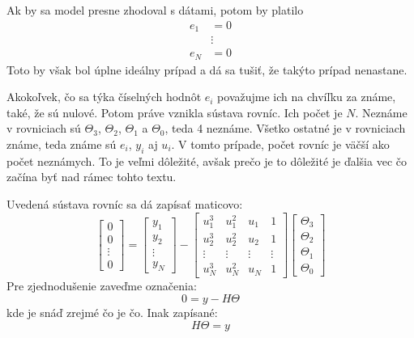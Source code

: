 \documentclass[a4paper, 10pt, ]{article}
\begin{document}
Ak by sa model presne zhodoval s dátami, potom by platilo
\begin{subequations}
    \begin{align}
        e_1 &= 0 \\
        &\vdots \\
        e_N &= 0
    \end{align}
\end{subequations}
Toto by však bol úplne ideálny prípad a dá sa tušiť, že takýto prípad nenastane.

Akokoľvek, čo sa týka číselných hodnôt $e_i$ považujme ich na chvíľku za známe, také, že sú nulové. Potom práve vznikla sústava rovníc. Ich počet je $N$. Neznáme v rovniciach sú $\Theta_3$, $\Theta_2$, $\Theta_1$ a $\Theta_0$, teda 4 neznáme. Všetko ostatné je v rovniciach známe, teda známe sú $e_i$, $y_i$ aj $u_i$. V tomto prípade, počet rovníc je väčší ako počet neznámych. To je veľmi dôležité, avšak prečo je to dôležité je ďalšia vec čo začína byť nad rámec tohto textu.

Uvedená sústava rovníc sa dá zapísať maticovo:
\begin{equation} \label{detailPreurcVseob}
    \begin{bmatrix}
        0 \\ 0 \\\vdots \\ 0
    \end{bmatrix}
    =
    \begin{bmatrix}
        y_1 \\ y_2 \\\vdots \\ y_N
    \end{bmatrix}
    -
    \begin{bmatrix}
        u_1^3 & u_1^2 & u_1 & 1 \\
        u_2^3 & u_2^2 & u_2 & 1 \\
        \vdots & \vdots & \vdots & \vdots \\
        u_N^3 & u_N^2 & u_N & 1
    \end{bmatrix}
    \begin{bmatrix}
        \Theta_3 \\ \Theta_2 \\ \Theta_1 \\ \Theta_0
    \end{bmatrix}
\end{equation}
Pre zjednodušenie zaveďme označenia:
\begin{equation}
    0 = y - H \Theta
\end{equation}
kde je snáď zrejmé čo je čo. Inak zapísané:
\begin{equation} \label{psrtem}
    H \Theta = y
\end{equation}
\end{document}
